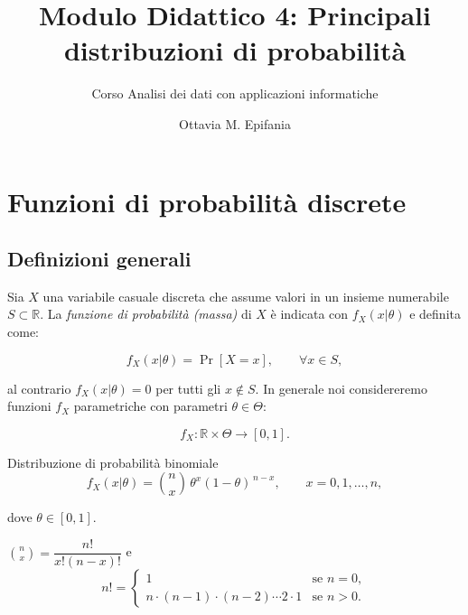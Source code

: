 \documentclass[
  ignorenonframetext,
  italian,
  compress, aspectratio=149]{beamer}
\title{Modulo Didattico 4: Principali distribuzioni di probabilità}
\subtitle{Corso Analisi dei dati con applicazioni informatiche}
\author{Ottavia M. Epifania}
\date{}
\begin{document}
\frame{\titlepage}


\section{Funzioni di probabilità
discrete}\label{funzioni-di-probabilituxe0-discrete}

\subsection{Definizioni generali}\label{definizioni-generali}

\begin{frame}{}
\label{section}
Sia \(X\) una variabile casuale discreta che assume valori in un insieme
numerabile \(S \subset \mathbb{R}\). La \emph{funzione di probabilità
(massa)} di \(X\) è indicata con \(f_X(x|\theta)\) e definita come:

\[f_X(x|\theta) = \Pr[X = x], \qquad \forall x \in S,\]

al contrario \(f_X(x|\theta) = 0\) per tutti gli \(x \notin S\). In
generale noi considereremo funzioni \(f_X\) parametriche con parametri
\(\theta \in \Theta\):

\[f_X : \mathbb{R} \times \Theta \to [0,1].
\]
\end{frame}

\begin{frame}{Distribuzione di probabilità binomiale}
\label{distribuzione-di-probabilituxe0-binomiale}
\[f_X(x|\theta) = \binom{n}{x}\, \theta^x (1-\theta)^{\,n-x}, 
\qquad x = 0,1,\ldots,n,\]

dove \(\theta \in [0,1]\).

\(\binom{n}{x} = \dfrac{n!}{x!(n-x)!}\) e \[n! =
\begin{cases} 
1 & \text{se } n = 0, \\[2mm]
n \cdot (n-1) \cdot (n-2) \cdots 2 \cdot 1 & \text{se } n > 0.
\end{cases}\]
\end{frame}
\end{document}
